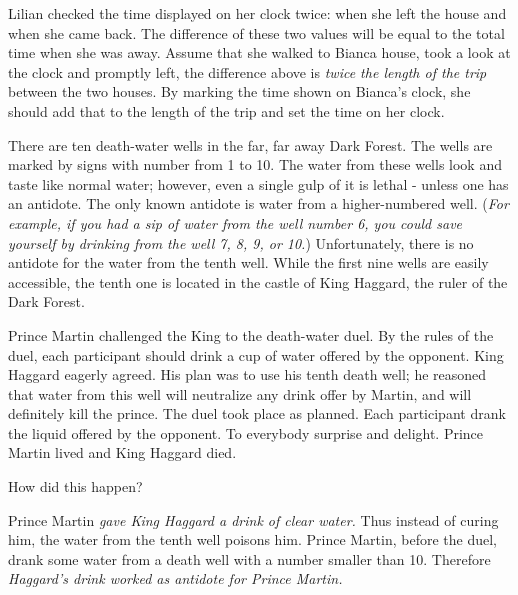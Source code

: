 \documentclass{article}
\begin{document}
\begin{soln} 
    Lilian checked the time displayed on her clock twice: when she left the house and when she came back.
    The difference of these two values will be equal to the total time when she was away.
    Assume that she walked to Bianca house, took a look at the clock and promptly left,
    the difference above is \textit{twice the length of the trip} between the two houses.
    By marking the time shown on Bianca's clock,
    she should add that to the length of the trip and set the time on her clock.
\end{soln}

\begin{example*}
    \label{example:pi-2022-4-p4}
    There are ten death-water wells in the far, far away Dark Forest.
    The wells are marked by signs with number from 1 to 10.
    The water from these wells look and taste like normal water;
    however, even a single gulp of it is lethal - unless one has an antidote.
    The only known antidote is water from a higher-numbered well.
    (\textit{For example, if you had a sip of water from the well number 6,
    you could save yourself by drinking from the well 7, 8, 9, or 10.})    
    Unfortunately, there is no antidote for the water from the tenth well.
    While the first nine wells are easily accessible,
    the tenth one is located in the castle of King Haggard, the ruler of the Dark Forest.
    
    Prince Martin challenged the King to the death-water duel.
    By the rules of the duel, each participant should drink a cup of water offered by the opponent.
    King Haggard eagerly agreed. His plan was to use his tenth death well;
    he reasoned that water from this well will neutralize any drink offer by Martin,
    and will definitely kill the prince.
    The duel took place as planned. Each participant drank the liquid offered by the opponent.
    To everybody surprise and delight. Prince Martin lived and King Haggard died.
    
    How did this happen?
\end{example*}

\begin{soln} 
    Prince Martin \textit{gave King Haggard a drink of clear water.}
    Thus instead of curing him, the water from the tenth well poisons him.
    Prince Martin, before the duel, drank some water from a death well with a number smaller than 10.
    Therefore \textit{Haggard's drink worked as antidote for Prince Martin.}
\end{soln}
\end{document}
